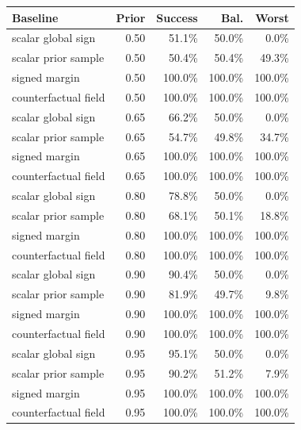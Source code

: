 \begin{tabular}{lrrrr}\toprule
Baseline & Prior & Success & Bal. & Worst\\
\midrule
scalar global sign & 0.50 & 51.1\% & 50.0\% & 0.0\%\\
scalar prior sample & 0.50 & 50.4\% & 50.4\% & 49.3\%\\
signed margin & 0.50 & 100.0\% & 100.0\% & 100.0\%\\
counterfactual field & 0.50 & 100.0\% & 100.0\% & 100.0\%\\
scalar global sign & 0.65 & 66.2\% & 50.0\% & 0.0\%\\
scalar prior sample & 0.65 & 54.7\% & 49.8\% & 34.7\%\\
signed margin & 0.65 & 100.0\% & 100.0\% & 100.0\%\\
counterfactual field & 0.65 & 100.0\% & 100.0\% & 100.0\%\\
scalar global sign & 0.80 & 78.8\% & 50.0\% & 0.0\%\\
scalar prior sample & 0.80 & 68.1\% & 50.1\% & 18.8\%\\
signed margin & 0.80 & 100.0\% & 100.0\% & 100.0\%\\
counterfactual field & 0.80 & 100.0\% & 100.0\% & 100.0\%\\
scalar global sign & 0.90 & 90.4\% & 50.0\% & 0.0\%\\
scalar prior sample & 0.90 & 81.9\% & 49.7\% & 9.8\%\\
signed margin & 0.90 & 100.0\% & 100.0\% & 100.0\%\\
counterfactual field & 0.90 & 100.0\% & 100.0\% & 100.0\%\\
scalar global sign & 0.95 & 95.1\% & 50.0\% & 0.0\%\\
scalar prior sample & 0.95 & 90.2\% & 51.2\% & 7.9\%\\
signed margin & 0.95 & 100.0\% & 100.0\% & 100.0\%\\
counterfactual field & 0.95 & 100.0\% & 100.0\% & 100.0\%\\
\bottomrule\end{tabular}
